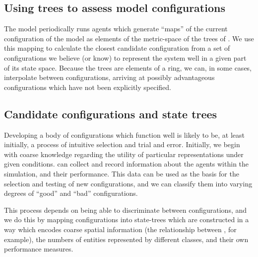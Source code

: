 \subsection{Using trees to assess model configurations}

The model periodically runs  agents which generate
``maps'' of the current configuration of the model as elements of the
metric-space of the trees of \Cfive.  We use this mapping to calculate
the closest candidate configuration from a set of configurations we
believe (or know) to represent the system well in a given part of its
state space. Because the trees are elements of a ring, we can, in some
cases, interpolate between configurations, arriving at possibly
advantageous configurations which have not been explicitly specified.

\subsection{Candidate configurations and state trees}

Developing a body of configurations which function well is likely to
be, at least initially, a process of intuitive selection and trial and
error. Initially, we begin with coarse knowledge regarding the utility
of particular representations under given conditions. \mloggers can
collect and record information about the agents within the simulation,
and their performance. This data can be used as the basis for the
selection and testing of new configurations, and we can classify them
into varying degrees of ``good'' and ``bad'' configurations.

This process depends on being able to discriminate between
configurations, and we do this by mapping configurations into
state-trees which are constructed in a way which encodes coarse
spatial information (the relationship between \mpatches, for example),
the numbers of entities represented by different classes, and their
own performance measures.



